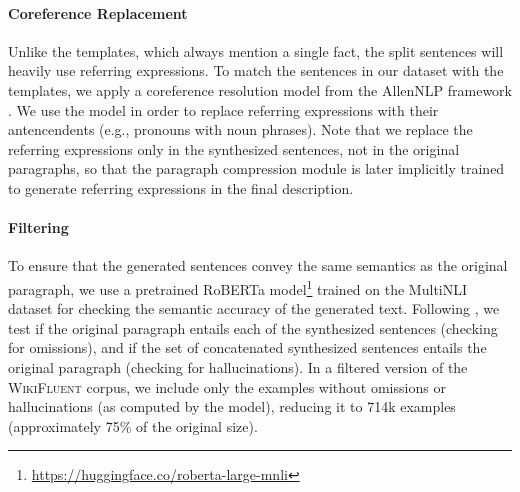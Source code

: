 


\paragraph{Coreference Replacement} Unlike the templates, which always mention a single fact, the split sentences will heavily use referring expressions. To match the sentences in our dataset with the templates, we apply a coreference resolution model \cite{Lee2018HigherorderCR} from the AllenNLP framework \cite{gardner2018allennlp}. We use the model in order to replace referring expressions with their antencendents (e.g., pronouns with noun phrases). Note that we replace the referring expressions only in the synthesized sentences, not in the original paragraphs, so that the paragraph compression module is later implicitly trained to generate referring expressions in the final description.

\paragraph{Filtering} To ensure that the generated sentences convey the same semantics as the original paragraph, we use a pretrained RoBERTa model\footnote{\url{https://huggingface.co/roberta-large-mnli}} \cite{liuRoBERTaRobustlyOptimized2019} trained on the MultiNLI dataset \cite{williams2018mnli} for checking the semantic accuracy of the generated text. Following \citet{dusekEvaluatingSemanticAccuracy2020}, we test if the original paragraph entails each of the synthesized sentences (checking for omissions), and if the set of concatenated synthesized sentences entails the original paragraph (checking for hallucinations). In a filtered version of the \textsc{WikiFluent} corpus, we include only the examples without omissions or hallucinations (as computed by the model), reducing it to 714k examples (approximately 75\% of the original size).

